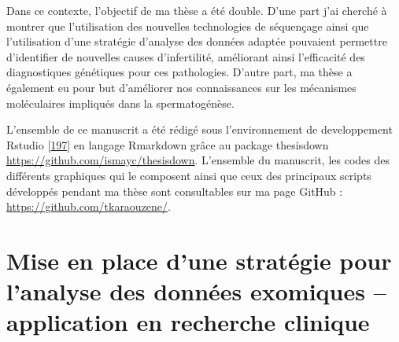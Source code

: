 \documentclass[12pt,a4paper,twoside]{ugathesis}
\theoremstyle{definition}
\theoremstyle{definition}
\theoremstyle{definition}
\theoremstyle{remark}
\begin{document}
Dans ce contexte, l'objectif de ma thèse a été double. D'une part j'ai
cherché à montrer que l'utilisation des nouvelles technologies de
séquençage ainsi que l'utilisation d'une stratégie d'analyse des données
adaptée pouvaient permettre d'identifier de nouvelles causes
d'infertilité, améliorant ainsi l'efficacité des diagnostiques
génétiques pour ces pathologies. D'autre part, ma thèse a également eu
pour but d'améliorer nos connaissances sur les mécanismes moléculaires
impliqués dans la spermatogénèse.

L'ensemble de ce manuscrit a été rédigé sous l'environnement de
developpement Rstudio {[}\protect\hyperlink{ref-RStudioTeam2015}{197}{]}
en langage Rmarkdown grâce au package thesisdown
\url{https://github.com/ismayc/thesisdown}. L'ensemble du manuscrit, les
codes des différents graphiques qui le composent ainsi que ceux des
principaux scripts développés pendant ma thèse sont consultables sur ma
page GitHub : \url{https://github.com/tkaraouzene/}.

\chapter{Mise en place d'une stratégie pour l'analyse des données
exomiques -- application en recherche
clinique}\label{mise-en-place-dune-strategie-pour-lanalyse-des-donnees-exomiques-application-en-recherche-clinique}

\newpage
\end{document}
